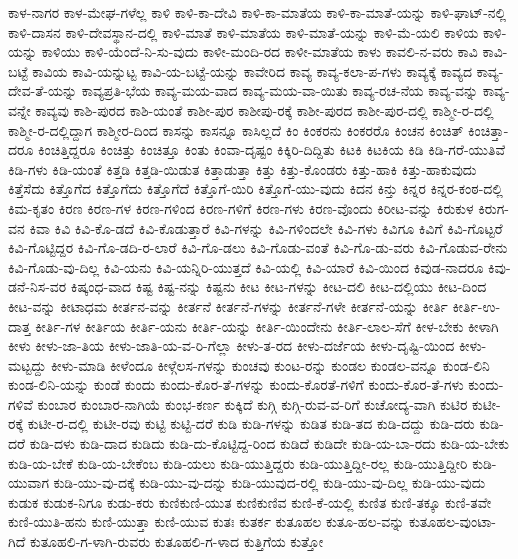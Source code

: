 ಕಾಳ-ನಾಗರ
ಕಾಳ-ಮೇಘ-ಗಳೆಲ್ಲ
ಕಾಳಿ
ಕಾಳಿ-ಕಾ-ದೇವಿ
ಕಾಳಿ-ಕಾ-ಮಾತೆಯ
ಕಾಳಿ-ಕಾ-ಮಾತೆ-ಯನ್ನು
ಕಾಳಿ-ಘಾಟ್‌-ನಲ್ಲಿ
ಕಾಳಿ-ದಾಸನ
ಕಾಳಿ-ದೇವಸ್ಥಾನ-ದಲ್ಲಿ
ಕಾಳಿ-ಮಾತೆ
ಕಾಳಿ-ಮಾತೆಯ
ಕಾಳಿ-ಮಾತೆ-ಯನ್ನು
ಕಾಳಿ-ಮೆ-ಯಲಿ
ಕಾಳಿಯ
ಕಾಳಿ-ಯನ್ನು
ಕಾಳಿಯು
ಕಾಳಿ-ಯೆಂದೆ-ನಿ-ಸು-ವುದು
ಕಾಳೀ-ಮಂದಿ-ರದ
ಕಾಳೀ-ಮಾತೆಯ
ಕಾಳು
ಕಾವಲಿ-ನ-ವರು
ಕಾವಿ
ಕಾವಿ-ಬಟ್ಟೆ
ಕಾವಿಯ
ಕಾವಿ-ಯನ್ನುಟ್ಟ
ಕಾವಿ-ಯ-ಬಟ್ಟೆ-ಯನ್ನು
ಕಾವೇರಿದ
ಕಾವ್ಯ
ಕಾವ್ಯ-ಕಲಾ-ಪ-ಗಳು
ಕಾವ್ಯಕ್ಕೆ
ಕಾವ್ಯದ
ಕಾವ್ಯ-ದೇವ-ತೆ-ಯನ್ನು
ಕಾವ್ಯಪ್ರತಿ-ಭೆಯ
ಕಾವ್ಯ-ಮಯ-ವಾದ
ಕಾವ್ಯ-ಮಯ-ವಾ-ಯಿತು
ಕಾವ್ಯ-ರಚ-ನೆಯ
ಕಾವ್ಯ-ವನ್ನು
ಕಾವ್ಯ-ವನ್ನೇ
ಕಾವ್ಯವು
ಕಾಶಿ-ಪುರದ
ಕಾಶಿ-ಯಂತೆ
ಕಾಶೀ-ಪುರ
ಕಾಶೀಪು-ರಕ್ಕೆ
ಕಾಶೀ-ಪುರದ
ಕಾಶೀ-ಪುರ-ದಲ್ಲಿ
ಕಾಶ್ಮೀ-ರ-ದಲ್ಲಿ
ಕಾಶ್ಮೀ-ರ-ದಲ್ಲಿದ್ದಾಗ
ಕಾಶ್ಮೀರ-ದಿಂದ
ಕಾಸನ್ನು
ಕಾಸನ್ನೂ
ಕಾಸಿಲ್ಲದೆ
ಕಿಂ
ಕಿಂಕರನು
ಕಿಂಕರರೊ
ಕಿಂಚನ
ಕಿಂಚಿತ್
ಕಿಂಚಿತ್ತಾ-ದರೂ
ಕಿಂಚಿತ್ತಿದ್ದರೂ
ಕಿಂಚಿತ್ತು
ಕಿಂಚಿತ್ತೂ
ಕಿಂತು
ಕಿಂವಾ-ದೃಷ್ಟಂ
ಕಿಕ್ಕಿರಿ-ದಿದ್ದಿತು
ಕಿಟಕಿ
ಕಿಟಕಿಯ
ಕಿಡಿ
ಕಿಡಿ-ಗರೆ-ಯುತಿವೆ
ಕಿಡಿ-ಗಳು
ಕಿಡಿ-ಯಂತೆ
ಕಿತ್ತಡಿ
ಕಿತ್ತಡಿ-ಯಿಡುತ
ಕಿತ್ತಾಡುತ್ತಾ
ಕಿತ್ತು
ಕಿತ್ತು-ಕೊಂಡರು
ಕಿತ್ತು-ಹಾಕಿ
ಕಿತ್ತು-ಹಾಕುವುದು
ಕಿತ್ತೆಸೆದು
ಕಿತ್ತೊಗೆದ
ಕಿತ್ತೊಗೆದು
ಕಿತ್ತೊಗೆದೆ
ಕಿತ್ತೊಗೆ-ಯಿರಿ
ಕಿತ್ತೊಗೆ-ಯು-ವುದು
ಕಿದನ
ಕಿನ್ತು
ಕಿನ್ನರ
ಕಿನ್ನರ-ಕಂಠ-ದಲ್ಲಿ
ಕಿಮ-ಕೃತಂ
ಕಿರಣ
ಕಿರಣ-ಗಳ
ಕಿರಣ-ಗಳಿಂದ
ಕಿರಣ-ಗಳಿಗೆ
ಕಿರಣ-ಗಳು
ಕಿರಣ-ವೊಂದು
ಕಿರೀಟ-ವನ್ನು
ಕಿರುಕುಳ
ಕಿರುಗ-ವನ
ಕಿವಾ
ಕಿವಿ
ಕಿವಿ-ಕೊ-ಡದೆ
ಕಿವಿ-ಕೊಡುತ್ತಾರೆ
ಕಿವಿ-ಗಳನ್ನು
ಕಿವಿ-ಗಳಿಂದಲೇ
ಕಿವಿ-ಗಳು
ಕಿವಿಗೂ
ಕಿವಿಗೆ
ಕಿವಿ-ಗೊಟ್ಟರೆ
ಕಿವಿ-ಗೊಟ್ಟಿದ್ದರ
ಕಿವಿ-ಗೊ-ಡದಿ-ರ-ಲಾರೆ
ಕಿವಿ-ಗೊ-ಡಲು
ಕಿವಿ-ಗೊಡು-ವಂತೆ
ಕಿವಿ-ಗೊ-ಡು-ವರು
ಕಿವಿ-ಗೊಡುವ-ರೇನು
ಕಿವಿ-ಗೊಡು-ವು-ದಿಲ್ಲ
ಕಿವಿ-ಯನು
ಕಿವಿ-ಯನ್ನಿರಿ-ಯುತ್ತದೆ
ಕಿವಿ-ಯಲ್ಲಿ
ಕಿವಿ-ಯಾರೆ
ಕಿವಿ-ಯಿಂದ
ಕಿವುಡ-ನಾದರೂ
ಕಿವು-ಡನೆ-ನಿಸ-ವರ
ಕಿಷ್ಕಂಧ-ವಾದ
ಕಿಷ್ಟ
ಕಿಷ್ಟ-ನನ್ನು
ಕಿಷ್ಟನು
ಕೀಟ
ಕೀಟ-ಗಳನ್ನು
ಕೀಟ-ದಲಿ
ಕೀಟ-ದಲ್ಲಿಯು
ಕೀಟ-ದಿಂದ
ಕೀಟ-ವನ್ನು
ಕೀಟಾಧಮ
ಕೀರ್ತನ-ವನ್ನು
ಕೀರ್ತನೆ
ಕೀರ್ತನೆ-ಗಳನ್ನು
ಕೀರ್ತನೆ-ಗಳೇ
ಕೀರ್ತನೆ-ಯನ್ನು
ಕೀರ್ತಿ
ಕೀರ್ತಿ-ಉ-ದಾತ್ತ
ಕೀರ್ತಿ-ಗಳ
ಕೀರ್ತಿಯ
ಕೀರ್ತಿ-ಯನು
ಕೀರ್ತಿ-ಯನ್ನು
ಕೀರ್ತಿ-ಯಿಂದೇನು
ಕೀರ್ತಿ-ಲಾಲ-ಸೆಗೆ
ಕೀಳ-ಬೇಕು
ಕೀಳಾಗಿ
ಕೀಳು
ಕೀಳು-ಜಾ-ತಿಯ
ಕೀಳು-ಜಾತಿ-ಯ-ವ-ರಿ-ಗೆಲ್ಲಾ
ಕೀಳು-ತ-ರದ
ಕೀಳು-ದರ್ಜೆಯ
ಕೀಳು-ದೃಷ್ಟಿ-ಯಿಂದ
ಕೀಳು-ಮಟ್ಟದ್ದು
ಕೀಳು-ಮಾಡಿ
ಕೀಳೆಂದೂ
ಕೀಳ್ಗೆಲಸ-ಗಳನ್ನು
ಕುಂಚವು
ಕುಂಟ-ರನ್ನು
ಕುಂಡಲ
ಕುಂಡಲ-ವನ್ನೂ
ಕುಂಡ-ಲಿನಿ
ಕುಂಡ-ಲಿನಿ-ಯನ್ನು
ಕುಂಡೆ
ಕುಂದು
ಕುಂದು-ಕೊರ-ತೆ-ಗಳನ್ನು
ಕುಂದು-ಕೊರತೆ-ಗಳಿಗೆ
ಕುಂದು-ಕೊರ-ತೆ-ಗಳು
ಕುಂದು-ಗಳಿವೆ
ಕುಂಬಾರ
ಕುಂಬಾರ-ನಾಗಿಯೆ
ಕುಂಭ-ಕರ್ಣ
ಕುಕ್ಕಿದೆ
ಕುಗ್ಗಿ
ಕುಗ್ಗಿ-ರುವ-ವ-ರಿಗೆ
ಕುಚೋದ್ಯ-ವಾಗಿ
ಕುಟಿರ
ಕುಟೀ-ರಕ್ಕೆ
ಕುಟೀ-ರ-ದಲ್ಲಿ
ಕುಟೀ-ರವು
ಕುಟ್ಟಿ
ಕುಟ್ಟಿ-ದರೆ
ಕುಡಿ
ಕುಡಿ-ಗಳನ್ನು
ಕುಡಿತ
ಕುಡಿ-ತದ
ಕುಡಿ-ದದ್ದು
ಕುಡಿ-ದರು
ಕುಡಿ-ದರೆ
ಕುಡಿ-ದಳು
ಕುಡಿ-ದಾದ
ಕುಡಿದು
ಕುಡಿ-ದು-ಕೊಟ್ಟಿದ್ದ-ರಿಂದ
ಕುಡಿದೆ
ಕುಡಿದೇ
ಕುಡಿ-ಯ-ಬಾ-ರದು
ಕುಡಿ-ಯ-ಬೇಕು
ಕುಡಿ-ಯ-ಬೇಕೆ
ಕುಡಿ-ಯ-ಬೇಕೆಂಬ
ಕುಡಿ-ಯಲು
ಕುಡಿ-ಯುತ್ತಿದ್ದರು
ಕುಡಿ-ಯುತ್ತಿದ್ದೀ-ರಲ್ಲ
ಕುಡಿ-ಯುತ್ತಿದ್ದೀರಿ
ಕುಡಿ-ಯುವಾಗ
ಕುಡಿ-ಯು-ವು-ದಕ್ಕೆ
ಕುಡಿ-ಯು-ವು-ದನ್ನು
ಕುಡಿ-ಯುವುದ-ರಲ್ಲಿ
ಕುಡಿ-ಯು-ವು-ದಿಲ್ಲ
ಕುಡಿ-ಯು-ವುದು
ಕುಡುಕ
ಕುಡುಕ-ನಿಗೂ
ಕುಡು-ಕರು
ಕುಣಿಕುಣಿ-ಯುತ
ಕುಣಿಕುಣಿವ
ಕುಣಿ-ಕೆ-ಯಲ್ಲಿ
ಕುಣಿತ
ಕುಣಿ-ತಕ್ಕೂ
ಕುಣಿ-ತವೇ
ಕುಣಿ-ಯುತಿ-ಹನು
ಕುಣಿ-ಯುತ್ತಾ
ಕುಣಿ-ಯುವ
ಕುತಃ
ಕುತರ್ಕ
ಕುತೂಹಲ
ಕುತೂ-ಹಲ-ವನ್ನು
ಕುತೂಹಲ-ವುಂಟಾ-ಗಿದೆ
ಕುತೂಹಲಿ-ಗ-ಳಾಗಿ-ರುವರು
ಕುತೂಹಲಿ-ಗ-ಳಾದ
ಕುತ್ತಿಗೆಯ
ಕುತ್ತೋ
